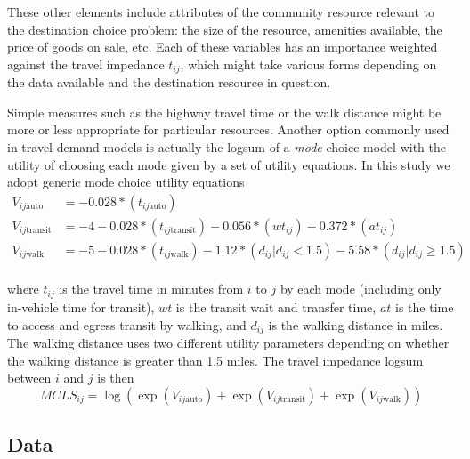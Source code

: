 \documentclass[review, 3p]{elsarticle} %
\begin{document}
These other elements include attributes of the community resource relevant to
the destination choice problem: the size of the resource, amenities available,
the price of goods on sale, etc. Each of these variables has an
importance weighted against the travel impedance \(t_{ij}\), which might take
various forms depending on the data available and the destination resource in
question.

Simple measures such as the highway travel time or the walk distance
might be more or less appropriate for particular resources. Another option
commonly used in travel demand models is actually the logsum of a \emph{mode}
choice model with the utility of choosing each mode given by a set of utility
equations. In this study we adopt generic mode choice utility equations
\begin{align*}
  V_{ij\mathrm{auto}} &= -0.028* (t_{ij\mathrm{auto}})\\
  V_{ij\mathrm{transit}} &= -4 -0.028* (t_{ij\mathrm{transit}}) 
    -0.056* (wt_{ij}) -0.372*(at_{ij})\\
  V_{ij\mathrm{walk}} &= -5 -0.028* (t_{ij\mathrm{walk}}) 
    -1.12* (d_{ij} | d_{ij} < 1.5)  
    -5.58* (d_{ij} | d_{ij} \geq 1.5) 
\end{align*}\\
where \(t_{ij}\) is the travel time in minutes from \(i\) to \(j\) by each mode
(including only in-vehicle time for transit), \(wt\) is the transit wait and
transfer time, \(at\) is the time to access and egress transit by walking, and \(d_{ij}\)
is the walking distance in miles. The walking distance uses two different
utility parameters depending on whether the walking distance is greater than 1.5
miles. The travel impedance logsum between \(i\) and \(j\) is then
\begin{equation}
MCLS_{ij} = \log\left(\exp(V_{ij\mathrm{auto}}) + \exp(V_{ij\mathrm{transit}}) + \exp(V_{ij\mathrm{walk}}) \right)
  \label{eq:mcls}
\end{equation}

\hypertarget{data}{%
\subsection{Data}\label{data}}
\end{document}
